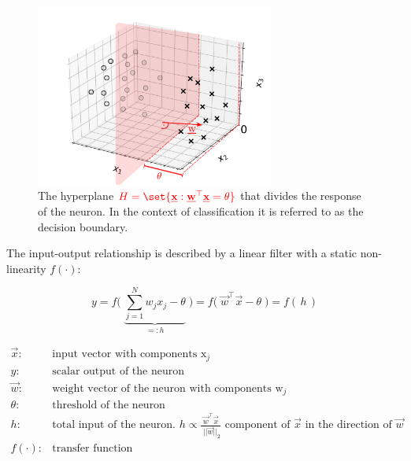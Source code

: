 \begin{frame}
    \begin{figure}[h]
        \centering
        \includegraphics[height=6cm]{img/neuron_3d_grid_hyperplane.pdf}
        \caption{The hyperplane $\color{red}H = \set{\vec x : \vec w^{\top} \vec x = \theta}$ that divides the response of the neuron. In the context of classification it is referred to as the decision boundary.}
        \label{fig:neuron_3d_grid_hyperplane}
    \end{figure}
    
    The input-output relationship is described by a linear filter with a static non-linearity $f(\cdot)$:

    \begin{equation}
        \label{eq:linearNeuron}
        y = f \Big(\; \underbrace{\sum_{j=1}^{N} {w}_{j} 
            {x}_j - \theta}_{=:h} \; \Big)
            = f \big(\;  \vec{w}^{\top}
            \vec{x}- \theta \; \big)
            = f(\,h\,)
    \end{equation}
    
	\[ \begin{array}{ll} 
		\vec{x}: & \text{input vector with components } \mathrm{x}_j \\
		y: & \text{scalar output of the neuron } \\
		\vec{w}: & \text{weight vector of the neuron with components }
			\mathrm{w}_{j}\\
		\theta: & \text{threshold of the neuron} \\
		h: & \text{total input of the neuron. } h \propto \frac{\vec w^\top \vec x}{\;||\vec w||_2} \text{ component of $\vec x$ in the direction of $\vec w$}\\
		f(\cdot): & \text{transfer function}
	\end{array} \]
    
\end{frame}

